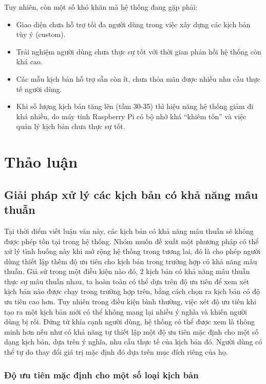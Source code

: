 \documentclass[12pt,a4paper,oneside]{extbook}
\begin{document}
\noindent
Tuy nhiên, còn một số khó khăn mà hệ thống đang gặp phải:

\begin{itemize}[topsep=1mm,itemsep=-0.5mm]
\item Giao diện chưa hỗ trợ tối đa người dùng trong việc xây dựng các kịch bản tùy ý (custom).
\item Trải nghiệm người dùng chưa thực sự tốt với thời gian phản hồi hệ thống còn khá cao.
\item Các mẫu kịch bản hỗ trợ sẵn còn ít, chưa thỏa mãn được nhiều nhu cầu thực tế người dùng.
\item Khi số lượng kịch bản tăng lên (tầm 30-35) thì hiệu năng hệ thống giảm đi khá nhiều, do máy tính Raspberry Pi có bộ nhớ khá “khiêm tốn” và việc quản lý kịch bản chưa thực sự tốt.
\vspace{1mm}
\end{itemize}


\chapter{Thảo luận}
\section{Giải pháp xử lý các kịch bản có khả năng mâu thuẫn}

Tại thời điểm viết luận văn này, các kịch bản có khả năng mâu thuẫn sẽ không được phép tồn tại trong hệ thống. Nhóm muốn đề xuất một phương pháp có thể xử lý tình huống này khi mở rộng hệ thống trong tương lai, đó là cho phép người dùng thiết lập thêm độ ưu tiên cho kịch bản trong trường hợp có khả năng mâu thuẫn. Giả sử trong một điều kiện nào đó, 2 kịch bản có khả năng mâu thuẫn thực sự mâu thuẫn nhau, ta hoàn toàn có thể dựa trên độ ưu tiên để xem xét kịch bản nào được chạy trong trường hợp trên, bằng cách chọn ra kịch bản có độ ưu tiên cao hơn. Tuy nhiên trong điều kiện bình thường, việc xét độ ưu tiên khi tạo ra một kịch bản mới có thể không mang lại nhiều ý nghĩa và khiến người dùng bị rối. Đứng từ khía cạnh người dùng, hệ thống có thể được xem là thông minh hơn nếu như có khả năng tự thiết lập một độ ưu tiên mặc định cho một số dạng kịch bản, dựa trên ý nghĩa, nhu cầu thực tế của kịch bản đó. Người dùng có thể tự do thay đổi giá trị mặc định đó dựa trên mục đích riêng của họ.

\subsection{Độ ưu tiên mặc định cho một số loại kịch bản }
\end{document}
